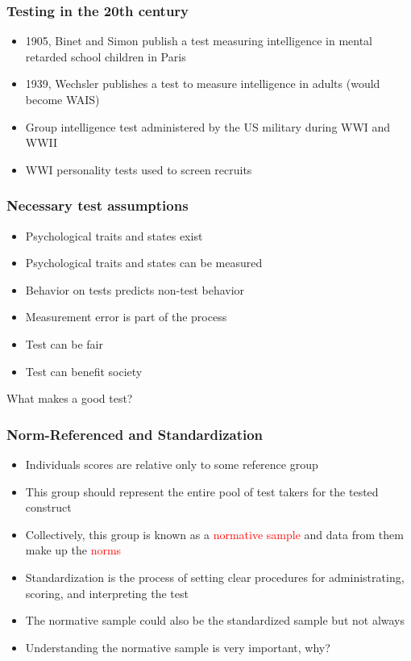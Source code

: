 \documentclass[dvipsnames]{beamer}\usepackage[]{graphicx}\usepackage[]{color}
\begin{document}
\begin{frame}
\frametitle{Testing in the 20th century}
\begin{itemize}
\item 1905, Binet and Simon publish a test measuring intelligence in mental retarded school children in Paris
\item 1939, Wechsler publishes a test to measure intelligence in adults (would become WAIS)
\item Group intelligence test administered by the US military during WWI and WWII
\item WWI personality tests used to screen recruits
\end{itemize}
\end{frame}

\begin{frame}
\frametitle{Necessary test assumptions}
\begin{itemize}
\item<1-> Psychological traits and states exist
\item<2-> Psychological traits and states can be measured
\item<3-> Behavior on tests predicts non-test behavior
\item<4-> Measurement error is part of the process
\item<5-> Test can be fair
\item<6-> Test can benefit society
\end{itemize}
\end{frame}

\begin{frame}
\centering
\large What makes a good test?
\end{frame}
\begin{frame}
\frametitle{Norm-Referenced and Standardization}
\begin{itemize}
\item<1-> Individuals scores are relative only to some reference group
\item<2-> This group should represent the entire pool of test takers for the tested construct
\item<3-> Collectively, this group is known as a \textcolor{red}{normative sample} and data from them make up the \textcolor{red}{norms}
\item<4-> Standardization is the process of setting clear procedures for administrating, scoring, and interpreting the test
\item<5-> The normative sample could also be the standardized sample but not always
\item<6-> Understanding the normative sample is very important, why?
\end{itemize}
\end{frame}
\end{document}
